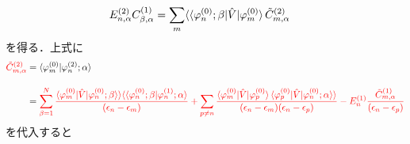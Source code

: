\begin{align}
    E^{(2)}_{n,\alpha}C^{(1)}_{\beta,\alpha}
    &=%
    \sum_{m}\langle\braket{\varphi^{(0)}_{n};\beta|\hat{V}|\varphi^{(0)}_m}
    \Tilde{C}^{(2)}_{m,\alpha}
\end{align}
を得る．上式に
\begin{align}
    \textcolor{red}{\Tilde{C}^{(2)}_{m,\alpha}}
    &=\braket{\varphi^{(0)}_{m}|\varphi^{(2)}_n;\alpha}\nn[10pt]
    &=\textcolor{red}{\sum_{\beta=1}^N
    \frac{\langle{\varphi^{(0)}_{m}|\hat{V}|\varphi^{(0)}_n;\beta}\rangle\rangle
    \langle\langle{\varphi^{(0)}_n;\beta|\varphi^{(1)}_n;\alpha}\rangle}{(\epsilon_n-\epsilon_m)}
    +\sum_{p\neq n}
    \frac{\langle{\varphi^{(0)}_{m}|\hat{V}|\varphi^{(0)}_p}\rangle
    \braket{\varphi^{(0)}_{p}|\hat{V}|\varphi^{(0)}_n;\alpha}\rangle}
    {(\epsilon_n-\epsilon_m)(\epsilon_n-\epsilon_p)}
    -E^{(1)}_n\frac{\Tilde{C}^{(1)}_{m,\alpha}}{(\epsilon_n-\epsilon_p)}}
\end{align}
を代入すると
